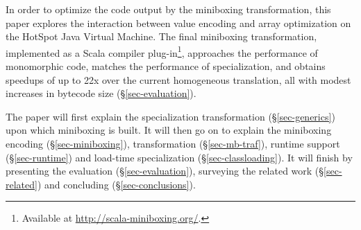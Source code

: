 In order to optimize the code output by the miniboxing transformation, this paper explores the interaction between value encoding and array optimization on the HotSpot Java Virtual Machine. The final miniboxing transformation, implemented as a Scala compiler plug-in\footnote{Available at \url{http://scala-miniboxing.org/}.}, approaches the performance of monomorphic code, matches the performance of specialization, and obtains speedups of up to 22x over the current homogeneous translation, all with modest increases in bytecode size (\S{}\ref{sec-evaluation}).

The paper will first explain the specialization transformation (\S\ref{sec-generics}) upon which miniboxing is built. It will then go on to explain the miniboxing encoding (\S\ref{sec-miniboxing}), transformation (\S\ref{sec-mb-traf}), runtime support (\S\ref{sec-runtime}) and load-time specialization (\S\ref{sec-classloading}). It will finish by presenting the evaluation (\S\ref{sec-evaluation}), surveying the related work (\S\ref{sec-related}) and concluding (\S\ref{sec-conclusions}).  
